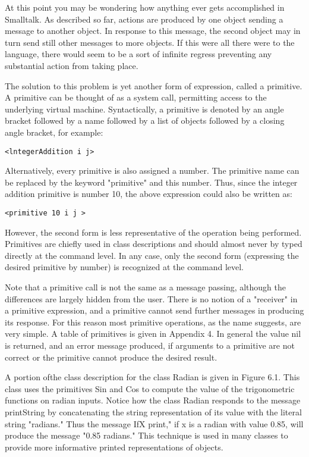 
At this point you may be wondering how anything ever gets accomplished in
Smalltalk. As described so far, actions are produced by one object sending a
message to another object. In response to this message, the second object may in
turn send still other messages to more objects. If this were all there were to
the language, there would seem to be a sort of infinite regress preventing any
substantial action from taking place.

The solution to this problem is yet another form of expression, called a
primitive. A primitive can be thought of as a system call, permitting access to
the underlying virtual machine. Syntactically, a primitive is denoted by an
angle bracket followed by a name followed by a list of objects followed by a
closing angle bracket, for example:
\begin{lstlisting}
<lntegerAddition i j>
\end{lstlisting}
Alternatively, every primitive is also assigned a number. The primitive name can
be replaced by the keyword "primitive" and this number. Thus, since the integer
addition primitive is number 10, the above expression could also be written as:
\begin{lstlisting}
<primitive 10 i j >
\end{lstlisting}
However, the second form is less representative of the operation being
performed. Primitives are chiefly used in class descriptions and should almost
never by typed directly at the command level. In any case, only the second form
(expressing the desired primitive by number) is recognized at the command level.

Note that a primitive call is not the same as a message passing, although the
differences are largely hidden from the user. There is no notion of a "receiver"
in a primitive expression, and a primitive cannot send further messages in
producing its response. For this reason most primitive operations, as the name
suggests, are very simple. A table of primitives is given in Appendix 4. In
general the value nil is returned, and an error message produced, if arguments
to a primitive are not correct or the primitive cannot produce the desired
result.

A portion ofthe class description for the class Radian is given in Figure 6.1.
This class uses the primitives Sin and Cos to compute the value of the
trigonometric functions on radian inputs. Notice how the class Radian responds
to the message printString by concatenating the string representation of its
value with the literal string "radians." Thus the message IfX print," if x is a
radian with value 0.85, will produce the message "0.85 radians." This technique
is used in many classes to provide more informative printed representations of
objects.

